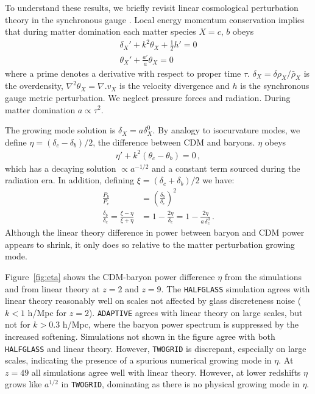 \documentclass[a4paper,11pt]{article}
\begin{document}
To understand these results, we briefly revisit linear cosmological perturbation theory in the synchronous gauge \cite{Ma:1995}. Local energy momentum conservation implies that during matter domination each matter species $X = c$, $b$ obeys
\begin{align}
 \delta_X' + k^2 \theta_X + \frac{1}{2} h' = 0 \\
 \theta_X' + \frac{a'}{a} \theta_X = 0
\end{align}
where a prime denotes a derivative with respect to proper time $\tau$. $\delta_X = \delta \rho_X / \bar{\rho}_X$ is the overdensity, $\nabla^2 \theta_X = \nabla. v_X $ is the velocity divergence and $h$ is the synchronous gauge metric perturbation. We neglect pressure forces and radiation. During matter domination $a \propto \tau^2$.

The growing mode solution is $\delta_X = a \delta_X^0$. By analogy to isocurvature modes, we define $\eta = (\delta_c - \delta_b)/2$, the difference between CDM and baryons. $\eta$ obeys
\begin{align}
 \eta' + k^2 (\theta_c - \theta_b) = 0\,,
\end{align}
which has a decaying solution $\propto a^{-1/2}$ and a constant term sourced during the radiation era. In addition, defining $\xi = (\delta_c + \delta_b) / 2$ we have:
\begin{align}
 \frac{P_b} {P_c} &= \left(\frac{\delta_b} {\delta_c}\right)^2 \\
\frac{\delta_b} {\delta_c} = \frac{\xi - \eta} {\xi + \eta} & = 1 - \frac{ 2 \eta} {\delta_c} = 1 - \frac{ 2 \eta} {a \,\delta_c^0}\,.
\end{align}
Although the linear theory difference in power between baryon and CDM power appears to shrink, it only does so relative to the matter perturbation growing mode.

Figure~\ref{fig:eta} shows the CDM-baryon power difference $\eta$ from the simulations and from linear theory at $z=2$ and $z=9$. The \texttt{HALFGLASS} simulation agrees with linear theory reasonably well on scales not affected by glass discreteness noise ($k < 1$ h/Mpc for $z=2$). \texttt{ADAPTIVE} agrees with linear theory on large scales, but not for $k > 0.3$ h/Mpc, where the baryon power spectrum is suppressed by the increased softening. Simulations not shown in the figure agree with both \texttt{HALFGLASS} and linear theory. However, \texttt{TWOGRID} is discrepant, especially on large scales, indicating the presence of a spurious numerical growing mode in $\eta$. At $z=49$ all simulations agree well with linear theory. However, at lower redshifts $\eta$ grows like $a^{1/2}$ in \texttt{TWOGRID}, dominating as there is no physical growing mode in $\eta$.
\end{document}
